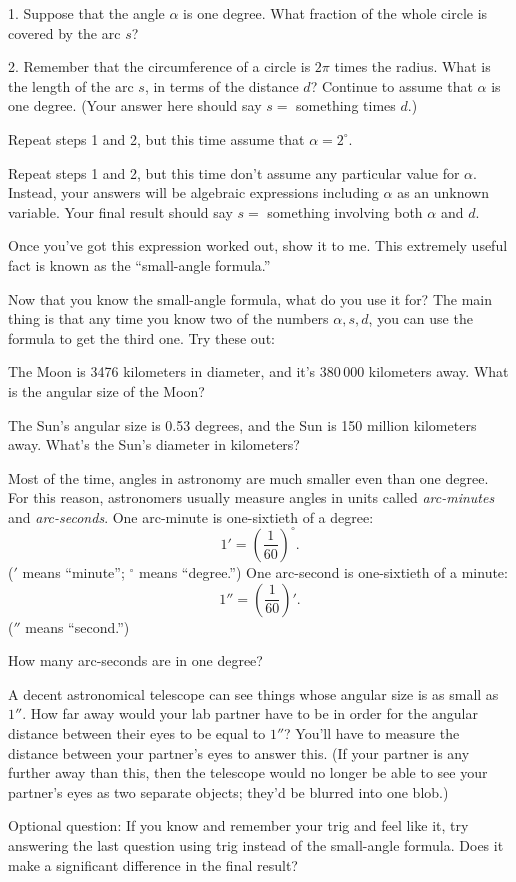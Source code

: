 1. Suppose that the angle $\alpha$ is one degree.  What fraction
of the whole circle is covered by the arc $s$?

\answerspace{1in}

2. Remember that the circumference of a circle is $2\pi$ times the
radius.  What is the length of the arc $s$, in terms of the distance
$d$?  Continue to assume that $\alpha$ is one degree.
(Your answer here should say $s=$ something times $d$.)


\answerspace{1in}


Repeat steps 1 and 2, but this time assume that $\alpha=2^\circ$.


\answerspace{1.5in}

\pagebreak[2]
Repeat steps 1 and 2, but this time don't assume any particular
value for $\alpha$.  Instead, your answers will be algebraic
expressions including $\alpha$ as an unknown variable.
Your final result should say $s=$ something involving both $\alpha$ and $d$.


\answerspace{2in}

Once you've got this expression worked out, show it to me.  This
extremely useful fact is known as the ``small-angle formula.''

Now that you know the small-angle formula, what do you use it for?
The main thing is that any time you know two of the numbers $\alpha,s,d$,
you can use the formula to get the third one.  Try these out:

The Moon is 3476 kilometers in diameter, and it's 380\,000 kilometers
away.  What is the angular size of the Moon?

\answerspace{1in}

The Sun's angular size is 0.53 degrees, and the Sun is 150 million
kilometers away.  What's the Sun's diameter in kilometers?

\answerspace{1in}

\pagebreak[3]
Most of the time, angles in astronomy are much smaller even than one degree.
For this reason, astronomers usually measure angles in units called
{\it arc-minutes} and {\it arc-seconds}.  One arc-minute is one-sixtieth
of a degree:
$$
1' = \left(\frac{1}{60}\right)^\circ.
$$
($'$ means ``minute''; $^\circ$ means ``degree.'')
One arc-second is one-sixtieth of a minute:
$$
1''=\left(\frac{1}{60}\right)'.
$$
($''$ means ``second.'')

How many arc-seconds are in one degree?

\answerspace{1in}

A decent astronomical telescope can see things whose angular size is
as small as $1''$.  How far away would your lab partner have to be in
order for the angular distance between their eyes to be equal to
$1''$?  You'll have to measure the distance between your partner's
eyes to answer this.  (If your partner is any further away than this,
then the telescope would no longer be able to see your partner's eyes
as two separate objects; they'd be blurred into one blob.)


\answerspace{1in}

Optional question:
If you know and remember your trig and feel like it, try answering
the last question using trig instead of the small-angle formula.  Does
it make a significant difference in the final result?

